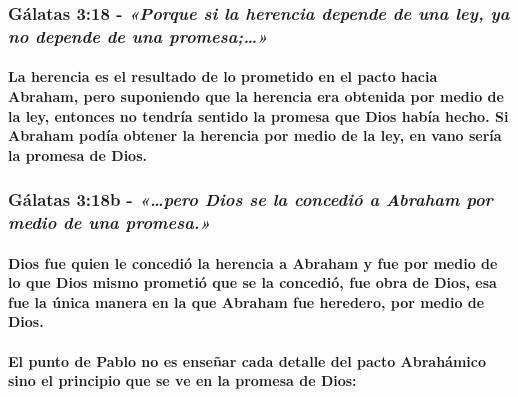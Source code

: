 \documentclass[11a pt,twoside]{article}
\newcommand{\scripture}[1]{%
  {\fontsize{12pt}{16pt}\selectfont\ScriptureFont\itshape #1}%
}
\let\oldsubsubsection\subsubsection
\renewcommand{\subsubsection}{\needspace{4\baselineskip}\oldsubsubsection}
\let\oldparagraph\paragraph
\renewcommand{\paragraph}{\needspace{3\baselineskip}\oldparagraph}
\begin{document}
\subsubsection{\texorpdfstring{Gálatas 3:18 -
\scripture{«Porque si la herencia depende de una ley, ya no depende de una promesa;…»}}{Gálatas 3:18 - }}\label{guxe1latas-318---porque-si-la-herencia-depende-de-una-ley-ya-no-depende-de-una-promesa}

\paragraph{La herencia es el resultado de lo prometido en el pacto hacia
Abraham, pero suponiendo que la herencia era obtenida por medio de la
ley, entonces no tendría sentido la promesa que Dios había hecho. Si
Abraham podía obtener la herencia por medio de la ley, en vano sería la
promesa de
Dios.}\label{la-herencia-es-el-resultado-de-lo-prometido-en-el-pacto-hacia-abraham-pero-suponiendo-que-la-herencia-era-obtenida-por-medio-de-la-ley-entonces-no-tendruxeda-sentido-la-promesa-que-dios-habuxeda-hecho.-si-abraham-poduxeda-obtener-la-herencia-por-medio-de-la-ley-en-vano-seruxeda-la-promesa-de-dios.}

\subsubsection{\texorpdfstring{Gálatas 3:18b -
\scripture{«…pero Dios se la concedió a Abraham por medio de una promesa.»}}{Gálatas 3:18b - }}\label{guxe1latas-318b---pero-dios-se-la-concediuxf3-a-abraham-por-medio-de-una-promesa.}

\paragraph{Dios fue quien le concedió la herencia a Abraham y fue por
medio de lo que Dios mismo prometió que se la concedió, fue obra de
Dios, esa fue la única manera en la que Abraham fue heredero, por medio
de
Dios.}\label{dios-fue-quien-le-concediuxf3-la-herencia-a-abraham-y-fue-por-medio-de-lo-que-dios-mismo-prometiuxf3-que-se-la-concediuxf3-fue-obra-de-dios-esa-fue-la-uxfanica-manera-en-la-que-abraham-fue-heredero-por-medio-de-dios.}

\paragraph{El punto de Pablo no es enseñar cada detalle del pacto
Abrahámico sino el principio que se ve en la promesa de
Dios:}\label{el-punto-de-pablo-no-es-enseuxf1ar-cada-detalle-del-pacto-abrahuxe1mico-sino-el-principio-que-se-ve-en-la-promesa-de-dios}
\end{document}
